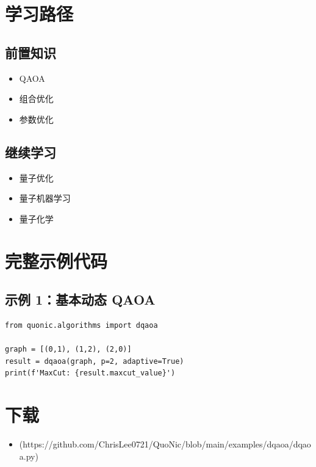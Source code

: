 \documentclass[12pt,a4paper]{article}
\begin{document}
\section{学习路径}

\subsection{前置知识}
\begin{itemize}
  \item QAOA
  \item 组合优化
  \item 参数优化
\end{itemize}

\subsection{继续学习}
\begin{itemize}
  \item 量子优化
  \item 量子机器学习
  \item 量子化学
\end{itemize}

\section{完整示例代码}

\subsection{示例 1：基本动态 QAOA}

\begin{verbatim}
from quonic.algorithms import dqaoa

graph = [(0,1), (1,2), (2,0)]
result = dqaoa(graph, p=2, adaptive=True)
print(f'MaxCut: {result.maxcut_value}')
\end{verbatim}

\section{下载}

\begin{itemize}
  \item [dqaoa.py](https://github.com/ChrisLee0721/QuoNic/blob/main/examples/dqaoa/dqaoa.py)
\end{itemize}
\end{document}
